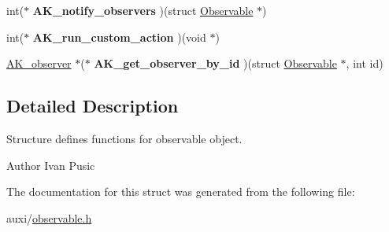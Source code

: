 \begin{DoxyCompactItemize}
\item 
\mbox{\label{structObservable_a05f19383999e5e859135f61a72f5b8b1}} 
int($\ast$ {\bfseries A\+K\+\_\+notify\+\_\+observers} )(struct \hyperlink{structObservable}{Observable} $\ast$)
\item 
\mbox{\label{structObservable_a9e6446ce8ac25456c0fbad20b6f6487b}} 
int($\ast$ {\bfseries A\+K\+\_\+run\+\_\+custom\+\_\+action} )(void $\ast$)
\item 
\mbox{\label{structObservable_a0786d94e8d985def36feb5893b0cc7ae}} 
\hyperlink{structObserver}{A\+K\+\_\+observer} $\ast$($\ast$ {\bfseries A\+K\+\_\+get\+\_\+observer\+\_\+by\+\_\+id} )(struct \hyperlink{structObservable}{Observable} $\ast$, int id)
\end{DoxyCompactItemize}


\subsection{Detailed Description}
Structure defines functions for observable object. 

\begin{DoxyAuthor}{Author}
Ivan Pusic 
\end{DoxyAuthor}


The documentation for this struct was generated from the following file\+:\begin{DoxyCompactItemize}
\item 
auxi/\hyperlink{observable_8h}{observable.\+h}\end{DoxyCompactItemize}
